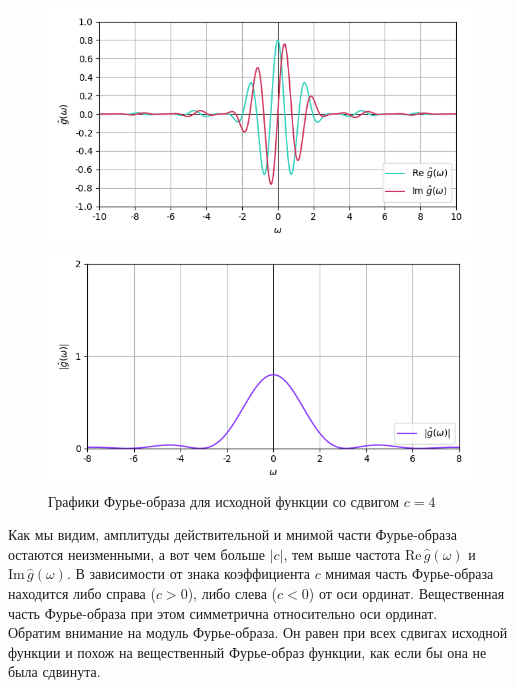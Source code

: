 \documentclass[a4paper]{article}
\begin{document}
\begin{figure}[H]
    \begin{minipage}{0.5\textwidth}
        \centering \includegraphics[width=\textwidth]{sources/6_complex/fourier_4.png}
    \end{minipage}\hfill
    \begin{minipage}{0.5\textwidth}
        \centering \includegraphics[width=\textwidth]{sources/6_complex/abs_4.png}
    \end{minipage}
    \caption{Графики Фурье-образа для исходной функции со сдвигом $c = 4$} 
\end{figure}
\noindent Как мы видим, амплитуды действительной и мнимой части Фурье-образа остаются неизменными, а вот чем больше $|c|$, тем выше частота $\text{Re}\,\hat{g}(\omega)$ и $\text{Im}\,\hat{g}(\omega)$. В зависимости от знака коэффициента $c$ мнимая часть Фурье-образа находится либо справа ($c > 0$), либо слева ($c < 0$) от оси ординат. Вещественная часть Фурье-образа при этом симметрична относительно оси ординат.\\[0.5em]
Обратим внимание на модуль Фурье-образа. Он равен при всех сдвигах исходной функции и похож на вещественный Фурье-образ функции, как если бы она не была сдвинута.
\end{document}
